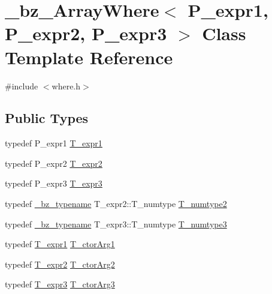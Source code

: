\hypertarget{class__bz__ArrayWhere}{}\section{\+\_\+bz\+\_\+\+Array\+Where$<$ P\+\_\+expr1, P\+\_\+expr2, P\+\_\+expr3 $>$ Class Template Reference}
\label{class__bz__ArrayWhere}


{\ttfamily \#include $<$where.\+h$>$}

\subsection*{Public Types}
\begin{DoxyCompactItemize}
\item 
typedef P\+\_\+expr1 \hyperlink{class__bz__ArrayWhere_a04df7e7b7c476f0412969686fe06b7eb}{T\+\_\+expr1}
\item 
typedef P\+\_\+expr2 \hyperlink{class__bz__ArrayWhere_aa417b5b88df486cc569c08a17c071aac}{T\+\_\+expr2}
\item 
typedef P\+\_\+expr3 \hyperlink{class__bz__ArrayWhere_a45f842d24f1a76bd7b277cc81c4a1168}{T\+\_\+expr3}
\item 
typedef \hyperlink{compiler_8h_a1bc40add3e72effc9cf69dbe445cbdfd}{\+\_\+bz\+\_\+typename} T\+\_\+expr2\+::\+T\+\_\+numtype \hyperlink{class__bz__ArrayWhere_ab9f464ff11ad352449616df25015af39}{T\+\_\+numtype2}
\item 
typedef \hyperlink{compiler_8h_a1bc40add3e72effc9cf69dbe445cbdfd}{\+\_\+bz\+\_\+typename} T\+\_\+expr3\+::\+T\+\_\+numtype \hyperlink{class__bz__ArrayWhere_a783ce23201ab34ad6e6e9f6d490102e3}{T\+\_\+numtype3}
\item 
typedef \hyperlink{class__bz__ArrayWhere_a04df7e7b7c476f0412969686fe06b7eb}{T\+\_\+expr1} \hyperlink{class__bz__ArrayWhere_a32c58caf104cc6fe6f26de21ebacf028}{T\+\_\+ctor\+Arg1}
\item 
typedef \hyperlink{class__bz__ArrayWhere_aa417b5b88df486cc569c08a17c071aac}{T\+\_\+expr2} \hyperlink{class__bz__ArrayWhere_ab66d71f81e4b0458bb111d8a723e8caa}{T\+\_\+ctor\+Arg2}
\item 
typedef \hyperlink{class__bz__ArrayWhere_a45f842d24f1a76bd7b277cc81c4a1168}{T\+\_\+expr3} \hyperlink{class__bz__ArrayWhere_a5ae4e744d3c88348295b3976c109122d}{T\+\_\+ctor\+Arg3}
\end{DoxyCompactItemize}
